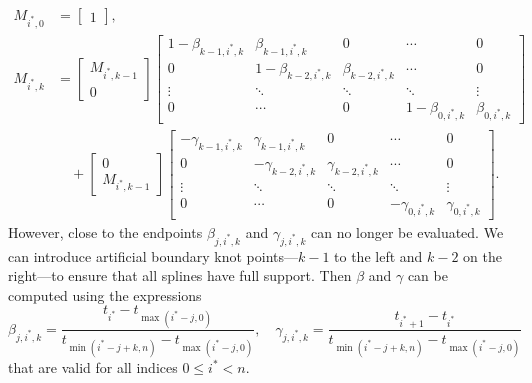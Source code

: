 \begin{equation}
  \begin{aligned}
    M_{i^*, 0} & = \begin{bmatrix} 1 \end{bmatrix},      \\
    M_{i^*, k} & = \begin{bmatrix} M_{i^*, k-1} \\ 0 \end{bmatrix}
    \begin{bmatrix}
      1 - \beta_{k-1,i^*,k} & \beta_{k-1,i^*,k}     & 0                    & \cdots               & 0                \\
      0                     & 1 - \beta_{k-2,i^*,k} & \beta_{k - 2,i^*, k} & \cdots               & 0                \\
      \vdots                & \ddots                & \ddots               & \ddots               & \vdots           \\
      0                     & \cdots                & 0                    & 1 - \beta_{0, i^*,k} & \beta_{0, i^*,k}
    \end{bmatrix}                      \\
               & \quad + \begin{bmatrix} 0 \\ M_{i^*, k-1} \end{bmatrix}
    \begin{bmatrix}
      -\gamma_{k-1, i^*, k} & \gamma_{k-1, i^*, k}  & 0                    & \cdots             & 0                 \\
      0                     & -\gamma_{k-2, i^*, k} & \gamma_{k-2, i^*, k} & \cdots             & 0                 \\
      \vdots                & \ddots                & \ddots               & \ddots             & \vdots            \\
      0                     & \cdots                & 0                    & -\gamma_{0, i^*,k} & \gamma_{0, i^*,k}
    \end{bmatrix}.
  \end{aligned}
\end{equation}
However, close to the endpoints $\beta_{j, i^*, k}$ and $\gamma_{j, i^*, k}$ can no longer be evaluated. We can introduce artificial boundary knot points---$k-1$ to the left and $k-2$ on the right---to ensure that all splines have full support. Then $\beta$ and $\gamma$ can be computed using the expressions
\begin{equation}
  \label{eq:beta_capped}
  \beta_{j, i^*, k} = \frac{t_{i^*} - t_{\max(i^* - j, 0)}}{t_{\min(i^* - j + k, n)} - t_{\max(i^* - j, 0)}}, \quad \gamma_{j, i^*, k} = \frac{t_{i^*+1} - t_{i^*}}{t_{\min(i^* - j + k, n)} - t_{\max(i^* - j, 0)}}
\end{equation}
that are valid for all indices $0 \leq i^* < n$.


